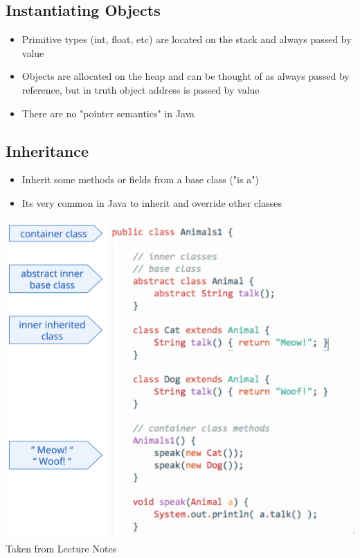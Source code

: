 \documentclass[twoside]{article}
\begin{document}
\subsection{Instantiating Objects}
\begin{itemize}
\item Primitive types (int, float, etc) are located on the stack and always passed by value
\item Objects are allocated on the heap and can be thought of as always passed by reference, but in truth object address is passed by value
\item There are no "pointer semantics" in Java
\end{itemize}

\subsection{Inheritance}
\begin{itemize}
\item Inherit some methods or fields from a base class ("is a") 
\item Its very common in Java to inherit and override other classes
\end{itemize}


\begin{center}
\includegraphics[scale=0.2]{13}\\
Taken from Lecture Notes
\end{center}
\end{document}
